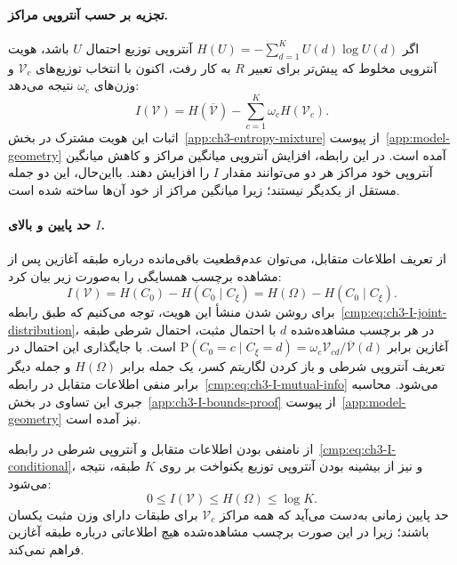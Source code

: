 \paragraph{تجزیه بر حسب آنتروپی مراکز.}
اگر $H(U)=-\sum_{d=1}^{K}U(d)\log U(d)$ آنتروپی توزیع احتمال $U$ باشد، هویت آنتروپی مخلوط که پیش‌تر برای تعبیر $R$ به کار رفت، اکنون با انتخاب توزیع‌های $\mathcal V_c$ و وزن‌های $\omega_c$ نتیجه می‌دهد:
\begin{equation}\label{cmp:eq:ch3-I-entropy}
\boxed{I(\mathcal V)=H(\overline{\mathcal V})
-\sum_{c=1}^{K}\omega_c H(\mathcal V_c).}
\end{equation}
اثبات این هویت مشترک در بخش~\ref{app:ch3-entropy-mixture} از پیوست~\ref{app:model-geometry} آمده است.
در این رابطه، افزایش آنتروپی میانگین مراکز و کاهش میانگین آنتروپی خود مراکز هر دو می‌توانند مقدار $I$ را افزایش دهند. بااین‌حال، این دو جمله مستقل از یکدیگر نیستند؛ زیرا میانگین مراکز از خود آن‌ها ساخته شده است.

\paragraph{حد پایین و بالای $I$.}
از تعریف اطلاعات متقابل، می‌توان عدم‌قطعیت باقی‌مانده درباره طبقه آغازین پس از مشاهده برچسب همسایگی را به‌صورت زیر بیان کرد:
\begin{equation}\label{cmp:eq:ch3-I-conditional}
\boxed{I(\mathcal V)=H(C_0)-H(C_0\mid C_\xi)
=H(\Omega)-H(C_0\mid C_\xi).}
\end{equation}
برای روشن شدن منشأ این هویت، توجه می‌کنیم که طبق رابطه~\eqref{cmp:eq:ch3-I-joint-distribution}، در هر برچسب مشاهده‌شده $d$ با احتمال مثبت، احتمال شرطی طبقه آغازین برابر
$\mathrm P(C_0=c\mid C_\xi=d)=\omega_c\mathcal V_{cd}/\overline{\mathcal V}(d)$ است. با جایگذاری این احتمال در تعریف آنتروپی شرطی و باز کردن لگاریتم کسر، یک جمله برابر $H(\Omega)$ و جمله دیگر برابر منفی اطلاعات متقابل در رابطه~\eqref{cmp:eq:ch3-I-mutual-info} می‌شود. محاسبه جبری این تساوی در بخش~\ref{app:ch3-I-bounds-proof} از پیوست~\ref{app:model-geometry} نیز آمده است.

از نامنفی بودن اطلاعات متقابل و آنتروپی شرطی در رابطه~\eqref{cmp:eq:ch3-I-conditional}، و نیز از بیشینه بودن آنتروپی توزیع یکنواخت بر روی $K$ طبقه، نتیجه می‌شود:
\begin{equation}\label{cmp:eq:ch3-I-bounds}
\boxed{0\le I(\mathcal V)\le H(\Omega)\le\log K.}
\end{equation}
حد پایین زمانی به‌دست می‌آید که همه مراکز $\mathcal V_c$ برای طبقات دارای وزن مثبت یکسان باشند؛ زیرا در این صورت برچسب مشاهده‌شده هیچ اطلاعاتی درباره طبقه آغازین فراهم نمی‌کند.

